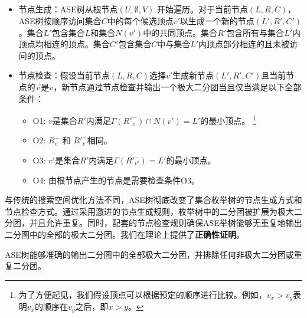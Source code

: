 \begin{itemize}
  \item 节点生成：ASE树从根节点$(U,\emptyset,V)$ 开始遍历。对于当前节点$(L,R,C)$，ASE树按顺序访问集合$C$中的每个候选顶点$v'$以生成一个新的节点$(L',R',C')$。集合$L'$包含集合$L$和集合$N(v')$中的共同顶点。集合$R'$包含所有与集合$L'$内顶点均相连的顶点。集合$C'$包含集合$C$中与集合$L'$内顶点部分相连的且未被访问的顶点。
  \item 节点检查：假设当前节点$(L,R,C)$选择$v'$生成新节点$(L',R',C')$且当前节点的$\vec{v}$是$v$，新节点通过节点检查并输出一个极大二分团当且仅当满足以下全部条件：
  
  \begin{itemize}
    \item O1: $v$是集合$R'$内满足$\Gamma({R'}_{v}^-) \cap N(v') = L'$的最小顶点。
    \footnote{为了方便起见，我们假设顶点可以根据预定的顺序进行比较。例如，$v_x > v_y$表明$v_x$的顺序在$v_y$之后，即$x > y$。}
    \item O2: ${R}_{v}^-$ 和 ${R'}_{v}^-$相同。
    \item O3: $v'$是集合$R'$内满足$\Gamma({R'}_{v'}^-) = L'$的最小顶点。
    \item O4: 由根节点产生的节点是需要检查条件O3。
  \end{itemize}
  
\end{itemize}

与传统的搜索空间优化方法不同，ASE树彻底改变了集合枚举树的节点生成方式和节点检查方式。通过采用激进的节点生成规则，枚举树中的二分团被扩展为极大二分团，并且允许重复。同时，配套的节点检查规则确保ASE举树能够无重复地输出二分图中的全部的极大二分团。我们在理论上提供了\textbf{正确性证明}。


\begin{theorem}
  \label{theorem:correctness}
  ASE树能够准确的输出二分图中的全部极大二分团，并排除任何非极大二分团或重复二分团。
\end{theorem}

